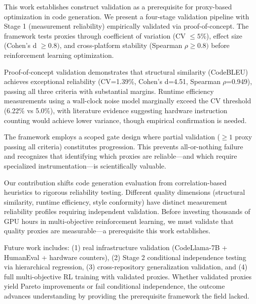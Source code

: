 
This work establishes construct validation as a prerequisite for proxy-based optimization in code generation. We present a four-stage validation pipeline with Stage 1 (measurement reliability) empirically validated via proof-of-concept. The framework tests proxies through coefficient of variation (CV $\leq 5$\%), effect size (Cohen's d $\geq 0.8)$, and cross-platform stability (Spearman $\rho \geq 0.8)$ before reinforcement learning optimization.

Proof-of-concept validation demonstrates that structural similarity (CodeBLEU) achieves exceptional reliability (CV=1.39\%, Cohen's d=4.51, Spearman $\rho$=0.949), passing all three criteria with substantial margins. Runtime efficiency measurements using a wall-clock noise model marginally exceed the CV threshold (6.22\% vs 5.0\%), with literature evidence suggesting hardware instruction counting would achieve lower variance, though empirical confirmation is needed.

The framework employs a scoped gate design where partial validation ($\geq 1$ proxy passing all criteria) constitutes progression. This prevents all-or-nothing failure and recognizes that identifying which proxies are reliable---and which require specialized instrumentation---is scientifically valuable.

Our contribution shifts code generation evaluation from correlation-based heuristics to rigorous reliability testing. Different quality dimensions (structural similarity, runtime efficiency, style conformity) have distinct measurement reliability profiles requiring independent validation. Before investing thousands of GPU hours in multi-objective reinforcement learning, we must validate that quality proxies are measurable---a prerequisite this work establishes.

Future work includes: (1) real infrastructure validation (CodeLlama-7B + HumanEval + hardware counters), (2) Stage 2 conditional independence testing via hierarchical regression, (3) cross-repository generalization validation, and (4) full multi-objective RL training with validated proxies. Whether validated proxies yield Pareto improvements or fail conditional independence, the outcome advances understanding by providing the prerequisite framework the field lacked.
